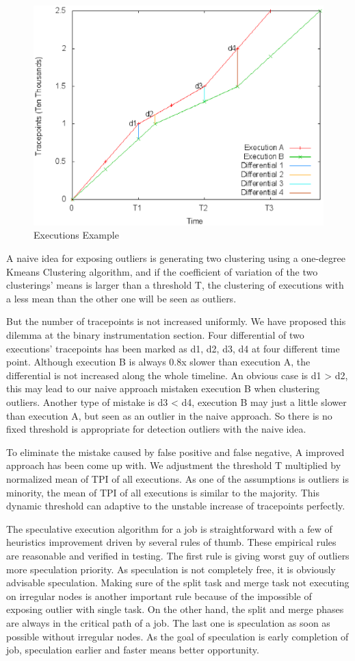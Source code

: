\begin{figure}
\centering
\includegraphics[width=0.62\columnwidth]{figures/executions_example.eps}
\caption{Executions Example}
\label{figure:executionsexample}
\end{figure}

A naive idea for exposing outliers is generating two clustering using a one-degree Kmeans Clustering algorithm, and if the coefficient of variation of the two clusterings’ means is larger than a threshold T, the clustering of executions with a less mean than the other one  will be seen as outliers.

But the number of tracepoints is not increased uniformly. We have proposed this dilemma at the binary instrumentation section. Four differential of two executions’ tracepoints has been marked as d1, d2, d3, d4 at four different time point. Although execution B is always 0.8x slower than execution A, the differential is not increased along the whole timeline. An obvious case is d1 > d2, this may lead to our naive approach mistaken execution B when clustering outliers. Another type of mistake is d3 < d4, execution B may just a little slower than execution A, but seen as an outlier in the naive approach. So there is no fixed threshold is appropriate for detection outliers with the naive idea.

To eliminate  the mistake caused by false positive and false negative, A improved approach has been come up with. We adjustment the threshold T multiplied by normalized mean of TPI of all executions. As one of the assumptions is outliers is minority, the mean of TPI of all executions is similar to the majority. This dynamic threshold can adaptive to the unstable increase of tracepoints perfectly.

The speculative execution algorithm for a job is straightforward with a few of heuristics improvement driven by several rules of thumb. These empirical rules are reasonable and verified in testing. The first rule is giving worst guy of outliers more speculation priority. As speculation is not completely free, it is obviously advisable speculation. Making sure of the split task and merge task not executing on irregular nodes is another important rule because of the impossible of exposing outlier with single task. On the other hand, the split and merge phases are always in the critical path of a job. The last one is speculation as soon as possible without irregular nodes. As the goal of speculation is early completion of job, speculation earlier and faster means better opportunity.

